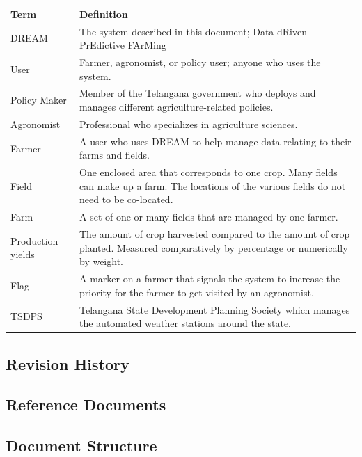 
\begin{center}
\renewcommand{\arraystretch}{1.25}
\begin{tabular}{l >{\raggedright\arraybackslash}p{12cm} } \hline
    \textbf{Term} & \textbf{Definition}\\ 
    DREAM & The system described in this document; Data-dRiven PrEdictive FArMing\\
    User & Farmer, agronomist, or policy user; anyone who uses the system.\\
	Policy Maker & Member of the Telangana government who deploys and manages different agriculture-related policies. \\
	Agronomist & Professional who specializes in agriculture sciences. \\
    Farmer & A user who uses DREAM to help manage data relating to their farms and fields.\\
    Field & One enclosed area that corresponds to one crop. Many fields can make up a farm. The locations of the various fields do not need to be co-located.\\
    Farm & A set of one or many fields that are managed by one farmer.\\
    Production yields & The amount of crop harvested compared to the amount of crop planted. Measured comparatively by percentage or numerically by weight.\\
    Flag & A marker on a farmer that signals the system to increase the priority for the farmer to get visited by an agronomist.\\
    TSDPS & Telangana State Development Planning Society which manages the automated weather stations around the state. \\
    \hline
\end{tabular}
\end{center}

\subsection{Revision History}
\subsection{Reference Documents}
\subsection{Document Structure}
